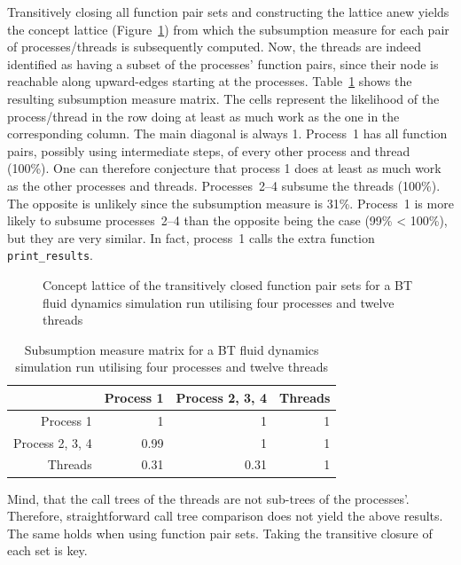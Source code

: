 \documentclass[a4paper, final, diplominf]{zih-template}
\begin{document}
Transitively closing all function pair sets and constructing the lattice anew yields the concept lattice (Figure~\ref{fig:bt-16p-transitive-concept-lattice}) from which the subsumption measure for each pair of processes/threads is subsequently computed.
Now, the threads are indeed identified as having a subset of the processes' function pairs, since their node is reachable along upward-edges starting at the processes.
Table~\ref{tab:bt-subsumption-metric-matrix} shows the resulting subsumption measure matrix.
The cells represent the likelihood of the process/thread in the row doing at least as much work as the one in the corresponding column.
The main diagonal is always 1.
Process~1 has all function pairs, possibly using intermediate steps, of every other process and thread (100\%).
One can therefore conjecture that process 1 does at least as much work as the other processes and threads.
Processes~2--4 subsume the threads (100\%).
The opposite is unlikely since the subsumption measure is 31\%.
Process~1 is more likely to subsume processes~2--4 than the opposite being the case (99\% < 100\%), but they are very similar.
In fact, process~1 calls the extra function \texttt{print\_results}.
\begin{figure}[t]
	\centering
	
	\caption{Concept lattice of the transitively closed function pair sets for a BT fluid dynamics simulation run utilising four processes and twelve threads}
	\label{fig:bt-16p-transitive-concept-lattice}
\end{figure}
\begin{table}[b]
	\centering
	\caption{Subsumption measure matrix for a BT fluid dynamics simulation run utilising four processes and twelve threads}
	\vspace{0.2cm}
	\begin{tabular}{r | r r r}
						& Process 1 & Process 2, 3, 4 & Threads \\
		\hline
		Process 1       &    1      &    1            & 1       \\
		Process 2, 3, 4 & 0.99      &    1            & 1       \\
		Threads         & 0.31      & 0.31            & 1       \\
	\end{tabular}
	\label{tab:bt-subsumption-metric-matrix}
\end{table}

Mind, that the call trees of the threads are not sub-trees of the processes'.
Therefore, straightforward call tree comparison does not yield the above results.
The same holds when using function pair sets.
Taking the transitive closure of each set is key.
\end{document}

